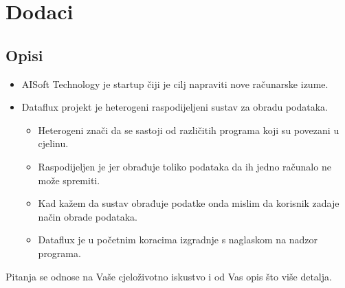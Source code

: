 \documentclass{article}
\begin{document}
\newpage
\section{Dodaci}


\subsection{Opisi}

\begin{itemize}
  \item AISoft Technology je startup čiji je cilj napraviti nove računarske izume.
  \item Dataflux projekt je heterogeni raspodijeljeni sustav za obradu podataka.
  \begin{itemize}
      \item Heterogeni znači da se sastoji od različitih programa koji su povezani u cjelinu.
      \item Raspodijeljen je jer obrađuje toliko podataka da ih jedno računalo ne može spremiti.
      \item Kad kažem da sustav obrađuje podatke onda mislim da korisnik zadaje način obrade podataka.
      \item Dataflux je u početnim koracima izgradnje s naglaskom na nadzor programa.
  \end{itemize}
\end{itemize}

Pitanja se odnose na Vaše cjeloživotno iskustvo i od Vas opis što više detalja.
\end{document}
